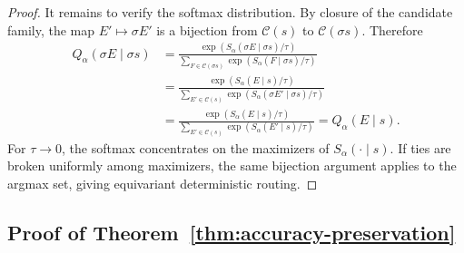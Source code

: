 \begin{proof}
It remains to verify the softmax distribution. By closure of the candidate
family, the map $E'\mapsto \sigma E'$ is a bijection from $\mathcal C(s)$ to
$\mathcal C(\sigma s)$. Therefore
\[
\begin{aligned}
    Q_\alpha(\sigma E\mid \sigma s)
    &=
    \frac{
    \exp(S_\alpha(\sigma E\mid \sigma s)/\tau)
    }{
    \sum_{F\in\mathcal C(\sigma s)}
    \exp(S_\alpha(F\mid \sigma s)/\tau)
    }\\
    &=
    \frac{
    \exp(S_\alpha(E\mid s)/\tau)
    }{
    \sum_{E'\in\mathcal C(s)}
    \exp(S_\alpha(\sigma E'\mid \sigma s)/\tau)
    }\\
    &=
    \frac{
    \exp(S_\alpha(E\mid s)/\tau)
    }{
    \sum_{E'\in\mathcal C(s)}
    \exp(S_\alpha(E'\mid s)/\tau)
    }
    =
    Q_\alpha(E\mid s).
\end{aligned}
\]
For $\tau\to0$, the softmax concentrates on the maximizers of
$S_\alpha(\cdot\mid s)$. If ties are broken uniformly among maximizers, the
same bijection argument applies to the argmax set, giving equivariant
deterministic routing. 
\end{proof}


\subsection{Proof of Theorem~\ref{thm:accuracy-preservation}}
\label{app:accuracy-preservation}

